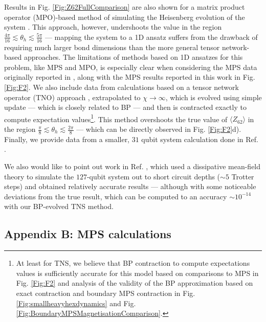 \documentclass[%
 superscriptaddress,
 amsmath,amssymb,
 prx, nofootinbib,
]{revtex4-2}
\begin{document}
\par Results in  Fig. \ref{Fig:Z62FullComparison} are also shown for a matrix product operator (MPO)-based method of simulating the Heisenberg evolution of the system \cite{Zalatel2023}. This approach, however, undershoots the value in the region $\frac{4\pi}{16} \lesssim \theta_{h} \lesssim \frac{5\pi}{16}$  --- mapping the system to a 1D ansatz suffers from the drawback of requiring much larger bond dimensions than the more general tensor network-based approaches. The limitations of methods based on 1D ansatzes for this problem, like MPS and MPO, is especially clear when considering the MPS data originally reported in \cite{kim2023}, along with the MPS results reported in this work in Fig. \ref{Fig:F2}. We also include data from calculations based on a tensor network operator (TNO) approach \cite{Liao2023}, extrapolated to $\chi \rightarrow \infty$, which is evolved using simple update --- which is closely related to BP \cite{Alkabetz2021, TindallGauging2023} --- and then is contracted exactly to compute expectation values\footnote{At least for TNS, we believe that BP contraction to compute expectations values is sufficiently accurate for this model based on comparisons to MPS in Fig. \ref{Fig:F2} and analysis of the validity of the BP approximation based on exact contraction and boundary MPS contraction in Fig. \ref{Fig:smallheavyhexdynamics} and Fig. \ref{Fig:BoundaryMPSMagnetisationComparison}.}. This method overshoots the true value of $\langle Z_{62} \rangle$ in the region $\frac{\pi}{8} \lesssim \theta_{h} \lesssim \frac{2\pi}{8}$  --- which can be directly observed in Fig. \ref{Fig:F2}d). Finally, we provide data from a smaller, $31$ qubit system calculation done in Ref. \cite{kechedzhi2023}.

\par We also would like to point out work in Ref. \cite{torre2023}, which used a dissipative mean-field theory to simulate the $127$-qubit system out to short circuit depths ($\sim 5$ Trotter steps) and obtained relatively accurate results --- although with some noticeable deviations from the true result, which can be computed to an accuracy $\sim 10^{-14}$ with our BP-evolved TNS method. 


\subsection*{Appendix B: MPS calculations}
\end{document}
